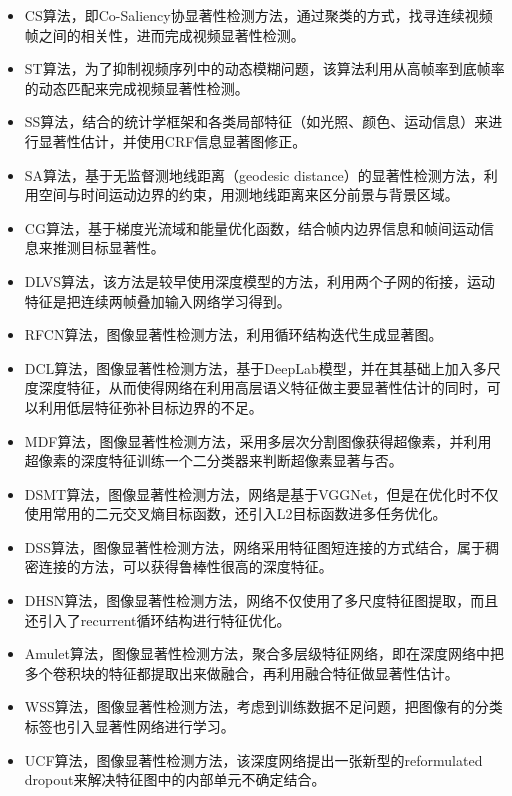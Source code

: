 \begin{itemize}
  \item CS算法\cite{fu2013cluster}，即Co-Saliency协显著性检测方法，通过聚类的方式，找寻连续视频帧之间的相关性，进而完成视频显著性检测。
  \item ST算法\cite{zhou2014time}，为了抑制视频序列中的动态模糊问题，该算法利用从高帧率到底帧率的动态匹配来完成视频显著性检测。
  \item SS算法\cite{rahtu2010segmenting}，结合的统计学框架和各类局部特征（如光照、颜色、运动信息）来进行显著性估计，并使用CRF信息显著图修正。
  \item SA算法\cite{wang2015saliency}，基于无监督测地线距离（geodesic distance）的显著性检测方法，利用空间与时间运动边界的约束，用测地线距离来区分前景与背景区域。
  \item CG算法\cite{wang2015consistent}，基于梯度光流域和能量优化函数，结合帧内边界信息和帧间运动信息来推测目标显著性。
  \item DLVS算法\cite{8047320}，该方法是较早使用深度模型的方法，利用两个子网的衔接，运动特征是把连续两帧叠加输入网络学习得到。
  \item RFCN算法\cite{wang2016saliency}，图像显著性检测方法，利用循环结构迭代生成显著图。
  \item DCL算法\cite{li2016deep}，图像显著性检测方法，基于DeepLab模型\cite{chen14semantic}，并在其基础上加入多尺度深度特征，从而使得网络在利用高层语义特征做主要显著性估计的同时，可以利用低层特征弥补目标边界的不足。
  \item MDF算法\cite{li2016visual}，图像显著性检测方法，采用多层次分割图像获得超像素，并利用超像素的深度特征训练一个二分类器来判断超像素显著与否。
  \item DSMT算法\cite{li2016deepsaliency}，图像显著性检测方法，网络是基于VGGNet，但是在优化时不仅使用常用的二元交叉熵目标函数，还引入L2目标函数进多任务优化。
  \item DSS算法\cite{DSSalCVPR2017}，图像显著性检测方法，网络采用特征图短连接的方式结合，属于稠密连接的方法，可以获得鲁棒性很高的深度特征。
  \item DHSN算法\cite{liu2016dhsnet}，图像显著性检测方法，网络不仅使用了多尺度特征图提取，而且还引入了recurrent循环结构进行特征优化。
  \item Amulet算法\cite{Zhang_2017_ICCV_Amulet}，图像显著性检测方法，聚合多层级特征网络，即在深度网络中把多个卷积块的特征都提取出来做融合，再利用融合特征做显著性估计。
  \item WSS算法\cite{Wang2017Learning}，图像显著性检测方法，考虑到训练数据不足问题，把图像有的分类标签也引入显著性网络进行学习。
  \item UCF算法\cite{Zhang_2017_ICCV_UCF}，图像显著性检测方法，该深度网络提出一张新型的reformulated dropout来解决特征图中的内部单元不确定结合。
\end{itemize}

